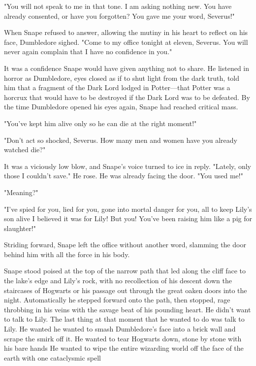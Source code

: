 "You will not speak to me in that tone. I am asking nothing new. You have already consented, or have you forgotten? You gave me your word, Severus!"

When Snape refused to answer, allowing the mutiny in his heart to reflect on his face, Dumbledore sighed. "Come to my office tonight at eleven, Severus. You will never again complain that I have no confidence in you."

It was a confidence Snape would have given anything not to share. He listened in horror as Dumbledore, eyes closed as if to shut light from the dark truth, told him that a fragment of the Dark Lord lodged in Potter—that Potter was a horcrux that would have to be destroyed if the Dark Lord was to be defeated. By the time Dumbledore opened his eyes again, Snape had reached critical mass.

"You've kept him alive only so he can die at the right moment!"

"Don't act so shocked, Severus. How many men and women have you already watched die?"

It was a viciously low blow, and Snape's voice turned to ice in reply. "Lately, only those I couldn't save." He rose. He was already facing the door. "You used me!"

"Meaning?"

"I've spied for you, lied for you, gone into mortal danger for you, all to keep Lily's son alive{\el} I believed it was for Lily! But you! You've been raising him like a pig for slaughter!"

Striding forward, Snape left the office without another word, slamming the door behind him with all the force in his body.

\sbreak

Snape stood poised at the top of the narrow path that led along the cliff face to the lake's edge and Lily's rock, with no recollection of his descent down the staircases of Hogwarts or his passage out through the great oaken doors into the night. Automatically he stepped forward onto the path, then stopped, rage throbbing in his veins with the savage beat of his pounding heart. He didn't want to talk to Lily. The last thing at that moment that he wanted to do was talk to Lily. He wanted{\el} he wanted to smash Dumbledore's face into a brick wall and scrape the smirk off it. He wanted to tear Hogwarts down, stone by stone with his bare hands He wanted to wipe the entire wizarding world off the face of the earth with one cataclysmic spell{\el}

